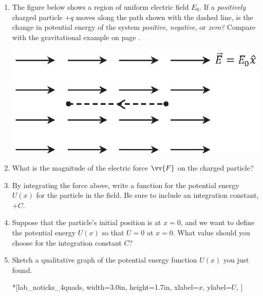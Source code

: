 \begin{enumerate}[labparts]

\item The figure below shows a region of uniform electric field $E_0$.  If a \textit{positively} charged particle $+q$ moves along the path shown with the dashed line, is the change in potential energy of the system \textit{positive}, \textit{negative}, or \textit{zero?}  Compare with the gravitational example on page \pageref{part_potential_intro_grav_work}.
\begin{center}
\includegraphics{potential_intro/activity_2_figs/uniform_E_field.eps}
\end{center}


\item What is the magnitude of the electric force $\vv{F}$ on the charged particle?
\answerspace{0.3in}

\item By integrating the force above, write a function for the potential energy $U(x)$ for the particle in the field.  Be sure to include an integration constant, $+C$.
\answerspace{0.3in}

\item Suppose that the particle's initial position is at $x=0$, and we want to define the potential energy $U(x)$ so that $U=0$ at $x=0$.  What value should you choose for the integration constant $C$?
\answerspace{0.3in}

\item Sketch a qualitative graph of the potential energy function $U(x)$ you just found.
\begin{lab_axis}*[lab_noticks_4quads,
	width={3.0in}, height={1.7in},
	xlabel={$x$},
	ylabel={$U$},
	]
\end{lab_axis}


\end{enumerate}
